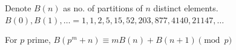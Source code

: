 Denote $B(n)$ as no. of partitions of $n$ distinct elements. 
{\small $B(0),B(1),\dotsc=1,1,2,5,15,52,203,877,4140,21147,\dotsc$}

For $p$ prime, $B(p^m+n)\equiv mB(n)+B(n+1) \pmod{p}$
